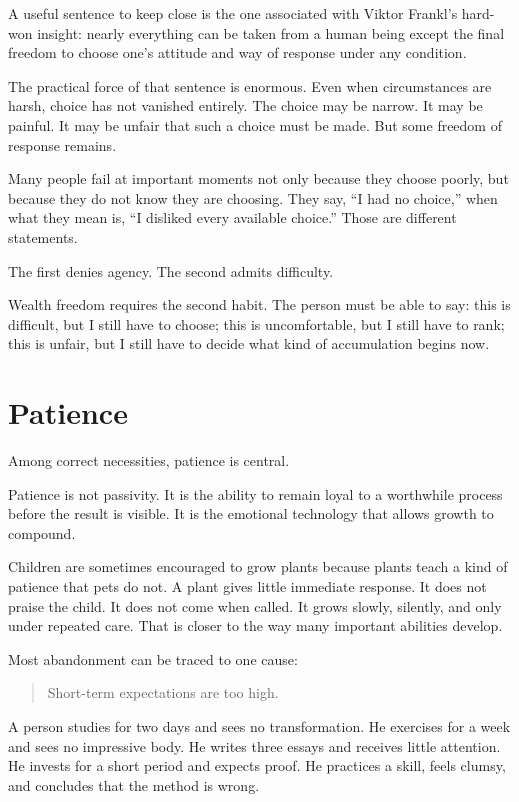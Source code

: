 A useful sentence to keep close is the one associated with Viktor Frankl's hard-won insight: nearly everything can be taken from a human being except the final freedom to choose one's attitude and way of response under any condition.

The practical force of that sentence is enormous. Even when circumstances are harsh, choice has not vanished entirely. The choice may be narrow. It may be painful. It may be unfair that such a choice must be made. But some freedom of response remains.

Many people fail at important moments not only because they choose poorly, but because they do not know they are choosing. They say, ``I had no choice,'' when what they mean is, ``I disliked every available choice.'' Those are different statements.

The first denies agency. The second admits difficulty.

Wealth freedom requires the second habit. The person must be able to say: this is difficult, but I still have to choose; this is uncomfortable, but I still have to rank; this is unfair, but I still have to decide what kind of accumulation begins now.

\section*{Patience}

Among correct necessities, patience is central.

Patience is not passivity. It is the ability to remain loyal to a worthwhile process before the result is visible. It is the emotional technology that allows growth to compound.

Children are sometimes encouraged to grow plants because plants teach a kind of patience that pets do not. A plant gives little immediate response. It does not praise the child. It does not come when called. It grows slowly, silently, and only under repeated care. That is closer to the way many important abilities develop.

Most abandonment can be traced to one cause:

\begin{quote}
Short-term expectations are too high.
\end{quote}

A person studies for two days and sees no transformation. He exercises for a week and sees no impressive body. He writes three essays and receives little attention. He invests for a short period and expects proof. He practices a skill, feels clumsy, and concludes that the method is wrong.

